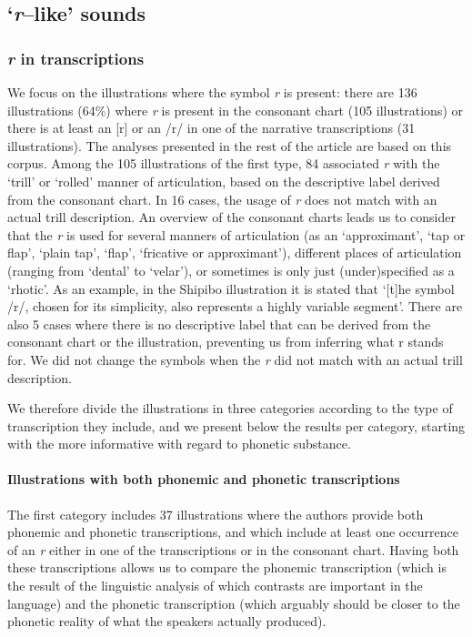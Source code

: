 \subsection{‘\textit{r}–like’ sounds}

\subsubsection{\textit{r} in transcriptions}

We focus on the illustrations where the symbol \textit{r} is present: there are 136 illustrations (64\%) where \textit{r} is present in the consonant chart (105 illustrations) or there is at least an [r] or an /r/ in one of the narrative transcriptions (31 illustrations). The analyses presented in the rest of the article are based on this corpus. Among the 105 illustrations of the first type, 84 associated \textit{r} with the ‘trill’ or ‘rolled’ manner of articulation, based on the descriptive label derived from the consonant chart. In 16 cases, the usage of \textit{r} does not match with an actual trill description. An overview of the consonant charts leads us to consider that the \textit{r} is used for several manners of articulation (as an ‘approximant’, ‘tap or flap’, ‘plain tap’, ‘flap’, ‘fricative or approximant’), different places of articulation (ranging from ‘dental’ to ‘velar’), or sometimes is only just (under)specified as a ‘rhotic’. As an example, in the Shipibo illustration \parencite[282]{valenzuelaShipibo2001} it is stated that ‘[t]he symbol /r/, chosen for its simplicity, also represents a highly variable segment’. There are also 5 cases where there is no descriptive label that can be derived from the consonant chart or the illustration, preventing us from inferring what r stands for. We did not change the symbols when the \textit{r} did not match with an actual trill description.

We therefore divide the illustrations in three categories according to the type of transcription they include, and we present below the results per category, starting with the more informative with regard to phonetic substance.

\paragraph{Illustrations with both phonemic and phonetic transcriptions}

The first category includes 37 illustrations where the authors provide both phonemic and phonetic transcriptions, and which include at least one occurrence of an \textit{r} either in one of the transcriptions or in the consonant chart. Having both these transcriptions allows us to compare the phonemic transcription (which is the result of the linguistic analysis of which contrasts are important in the language) and the phonetic transcription (which arguably should be closer to the phonetic reality of what the speakers actually produced).


